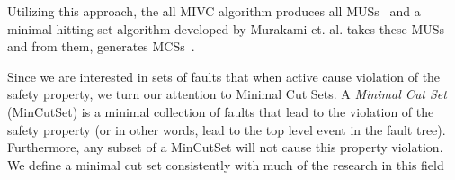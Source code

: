 Utilizing this approach, the all MIVC algorithm produces all MUSs~\cite{Ghassabani2017EfficientGO} and a minimal hitting set algorithm developed by Murakami et. al. takes these MUSs and from them, generates MCSs~\cite{murakami2013efficient,gainer2017minimal}.

Since we are interested in sets of faults that when active cause violation of the safety property, we turn our attention to Minimal Cut Sets. A \textit{Minimal Cut Set} (MinCutSet) is a minimal collection of faults that lead to the violation of the safety property (or in other words, lead to the top level event in the fault tree). Furthermore, any subset of a MinCutSet will not cause this property violation. We define a minimal cut set consistently with much of the research in this field~\cite{0f356f05e72f43018211b36f97c8854a,historyFTA}

